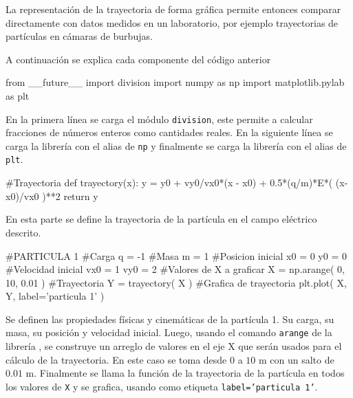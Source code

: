La representación de la trayectoria de forma gráfica permite entonces 
comparar directamente con datos medidos en un laboratorio, por ejemplo 
trayectorias de partículas en cámaras de burbujas.

\newpage

A continuación se explica cada componente del código anterior


\begin{listing}[style=python, numbers = none]
from __future__ import division
import numpy as np
import matplotlib.pylab as plt
\end{listing}
En la primera línea se carga el módulo \texttt{division}, este permite a 
\python calcular fracciones de números enteros como cantidades reales. En
la siguiente línea se carga la librería \numpy con el alias de \texttt{np}
y finalmente se carga la librería \matplotlib con el alias de \texttt{plt}.


\begin{listing}[style=python, numbers = none]
#Trayectoria
def trayectory(x):
    y = y0 + vy0/vx0*(x - x0) + 0.5*(q/m)*E*( (x-x0)/vx0 )**2
    return y
\end{listing}
En esta parte se define la trayectoria de la partícula en el campo 
eléctrico descrito.

\begin{listing}[style=python, numbers = none]    
#PARTICULA 1
#Carga
q = -1
#Masa
m = 1
#Posicion inicial
x0 = 0
y0 = 0
#Velocidad inicial
vx0 = 1
vy0 = 2
#Valores de X a graficar
X = np.arange( 0, 10, 0.01 )
#Trayectoria
Y = trayectory( X )
#Grafica de trayectoria
plt.plot( X, Y, label='particula 1' )
\end{listing}
Se definen las propiedades físicas y cinemáticas de la partícula 1. Su 
carga, su masa, su posición y velocidad inicial. Luego, usando el comando
\texttt{arange} de la librería \numpy, se construye un arreglo de valores 
en el eje X que serán usados para el cálculo de la trayectoria. En este 
caso se toma desde 0 a $10$ m con un salto de $0.01$ m. Finalmente se 
llama la función de la trayectoria de la partícula en todos los valores de
\texttt{X} y se grafica, usando como etiqueta \texttt{label='particula 1'}.


